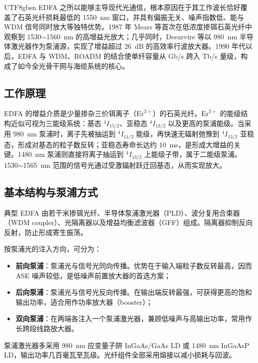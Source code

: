 \documentclass[11pt,a4paper]{article}
\begin{document}
\begin{CJK}{UTF8}{gbsn}
EDFA 之所以能够主导现代光通信，根本原因在于其工作波长恰好覆盖了石英光纤损耗最低的 1550~nm 窗口，并具有偏振无关、噪声指数低、能与 WDM 信号同时放大等独特优势。1987 年 Mears 等首次在低浓度掺铒石英光纤中观察到 1530$\sim$1560~nm 的高增益光放大\cite{mears1987}；几乎同时，Desurvire 等以 980~nm 半导体激光器作为泵浦源，实现了增益超过 26~dB 的高效率行波放大器\cite{desurvire1987}。1990 年代以后，EDFA 与 WDM、ROADM 的结合使单纤容量从 Gb/s 跨入 Tb/s 量级，构成了如今全光骨干网与海缆系统的核心\cite{becker1999,agrawal2010}。

\subsection{工作原理}

EDFA 的增益介质是少量掺杂三价铒离子（$\mathrm{Er}^{3+}$）的石英光纤。$\mathrm{Er}^{3+}$ 的能级结构近似可视为三能级系统：基态 $^4I_{15/2}$、亚稳态 $^4I_{13/2}$ 以及更高的泵浦能级。当采用 980~nm 泵浦时，离子先被抽运到 $^4I_{11/2}$ 能级，再快速无辐射弛豫到 $^4I_{13/2}$ 亚稳态，形成对基态的粒子数反转；亚稳态寿命长达约 10~ms，是形成大增益的关键。1480~nm 泵浦则直接将离子抽运到 $^4I_{13/2}$ 上能级子带，属于二能级泵浦。1530$\sim$1565~nm 范围的信号光通过受激辐射跃迁回基态，从而实现放大。

\subsection{基本结构与泵浦方式}

典型 EDFA 由若干米掺铒光纤、半导体泵浦激光器（PLD）、波分复用合束器（WDM coupler）、光隔离器以及增益均衡滤波器（GFF）组成。隔离器抑制反向反射，防止形成寄生振荡。

按泵浦光的注入方向，可分为：

\begin{itemize}[leftmargin=2.5em,itemsep=2pt]
\item \textbf{前向泵浦}：泵浦光与信号光同向传播。优势在于输入端粒子数反转最高，因而 ASE 噪声较低，是低噪声前置放大器的首选方案；
\item \textbf{后向泵浦}：泵浦光与信号光反向传播。在输出端反转最强，可获得更高的饱和输出功率，适合用作功率放大器（booster）；
\item \textbf{双向泵浦}：在两端各注入一个泵浦激光器，兼顾低噪声与高输出功率，常用作长跨段线路放大器。
\end{itemize}

泵浦激光器多采用 980~nm 应变量子阱 InGaAs/GaAs LD 或 1480~nm InGaAsP LD，输出功率几百毫瓦至瓦级。光纤组件全部采用熔接以减小损耗与回波。


\end{CJK}
\end{document}
